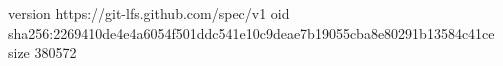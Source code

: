 version https://git-lfs.github.com/spec/v1
oid sha256:2269410de4e4a6054f501ddc541e10c9deae7b19055cba8e80291b13584c41ce
size 380572
